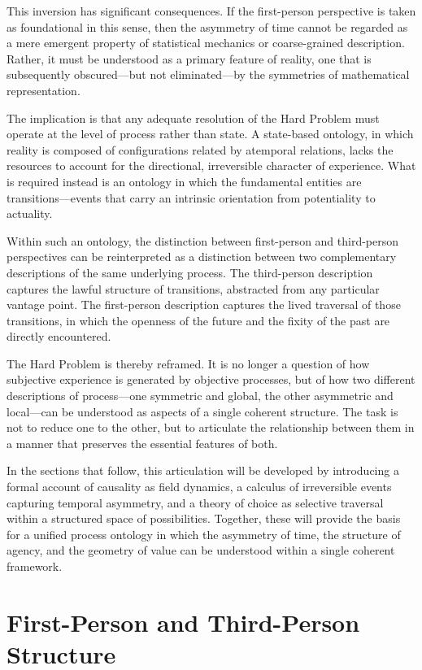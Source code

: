 \documentclass[11pt,a4paper]{article}
\theoremstyle{definition}
\theoremstyle{remark}
\begin{document}
This inversion has significant consequences. If the first-person perspective is taken as foundational in this sense, then the asymmetry of time cannot be regarded as a mere emergent property of statistical mechanics or coarse-grained description. Rather, it must be understood as a primary feature of reality, one that is subsequently obscured---but not eliminated---by the symmetries of mathematical representation.

The implication is that any adequate resolution of the Hard Problem must operate at the level of process rather than state. A state-based ontology, in which reality is composed of configurations related by atemporal relations, lacks the resources to account for the directional, irreversible character of experience. What is required instead is an ontology in which the fundamental entities are transitions---events that carry an intrinsic orientation from potentiality to actuality.

Within such an ontology, the distinction between first-person and third-person perspectives can be reinterpreted as a distinction between two complementary descriptions of the same underlying process. The third-person description captures the lawful structure of transitions, abstracted from any particular vantage point. The first-person description captures the lived traversal of those transitions, in which the openness of the future and the fixity of the past are directly encountered.

The Hard Problem is thereby reframed. It is no longer a question of how subjective experience is generated by objective processes, but of how two different descriptions of process---one symmetric and global, the other asymmetric and local---can be understood as aspects of a single coherent structure. The task is not to reduce one to the other, but to articulate the relationship between them in a manner that preserves the essential features of both.

In the sections that follow, this articulation will be developed by introducing a formal account of causality as field dynamics, a calculus of irreversible events capturing temporal asymmetry, and a theory of choice as selective traversal within a structured space of possibilities. Together, these will provide the basis for a unified process ontology in which the asymmetry of time, the structure of agency, and the geometry of value can be understood within a single coherent framework.

\section{First-Person and Third-Person Structure}
\end{document}
